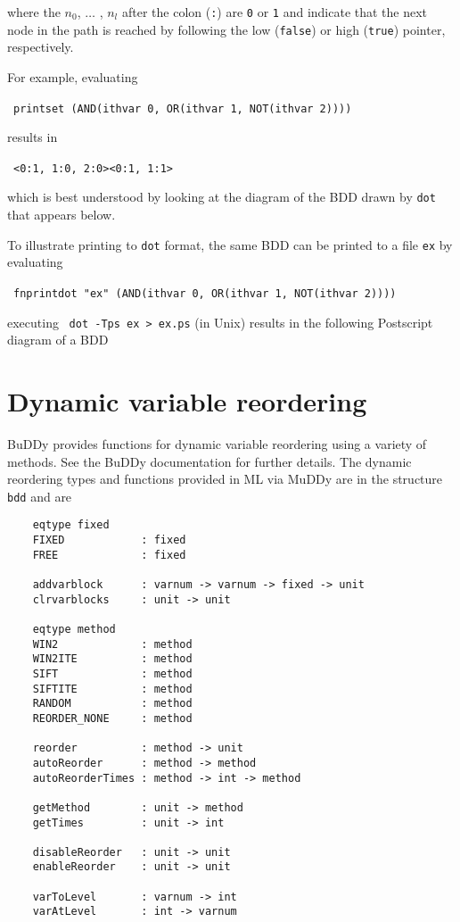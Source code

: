 \documentclass[12pt]{article}
\renewcommand{\t}[1]{\mbox{\tt #1}}
\newcommand{\Buddy}{BuDDy\xspace}
\newcommand{\Muddy}{MuDDy\xspace}
\begin{document}
where the $n_0$, $\ldots$ , $n_l$ after the colon (\t{:}) are \t{0} or
\t{1} and indicate that the next node in the path is reached by
following the low ({\t{false}}) or high ({\t{true}}) pointer,
respectively. 

For
example, evaluating

\smallskip
~\t{printset~(AND(ithvar~0,~OR(ithvar~1,~NOT(ithvar~2))))}
\smallskip

results in

\smallskip
~\t{<0:1,~1:0,~2:0><0:1,~1:1>}
\smallskip

which is best understood by looking at the diagram of the BDD drawn by
\t{dot} that appears below.

To illustrate printing to \t{dot} format,  the same BDD can be
printed to a file \t{ex} by evaluating

\smallskip
~\t{fnprintdot~"ex"~(AND(ithvar~0,~OR(ithvar~1,~NOT(ithvar~2))))}
\smallskip

executing ~\t{dot~-Tps~ex~>~ex.ps} (in Unix) results in
the following Postscript diagram of a BDD

\begin{center}
\end{center}

\section{Dynamic variable reordering}

\Buddy{} provides functions for dynamic variable reordering using a variety of methods.
See the \Buddy{} documentation \cite{BuDDy} for further details. The dynamic reordering
types and functions provided in ML via \Muddy{} are in the structure \t{bdd} and are

{\tiny\begin{verbatim}
    eqtype fixed
    FIXED            : fixed
    FREE             : fixed

    addvarblock      : varnum -> varnum -> fixed -> unit
    clrvarblocks     : unit -> unit

    eqtype method
    WIN2             : method
    WIN2ITE          : method
    SIFT             : method
    SIFTITE          : method
    RANDOM           : method
    REORDER_NONE     : method

    reorder          : method -> unit
    autoReorder      : method -> method
    autoReorderTimes : method -> int -> method

    getMethod        : unit -> method
    getTimes         : unit -> int

    disableReorder   : unit -> unit
    enableReorder    : unit -> unit

    varToLevel       : varnum -> int
    varAtLevel       : int -> varnum
\end{verbatim}}
\end{document}
